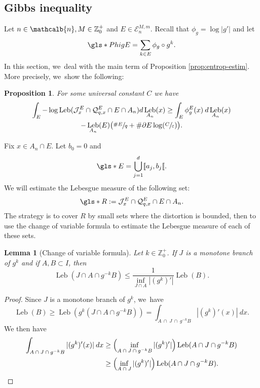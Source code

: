 \documentclass[JEP,XML,SOM,Unicode,NoFloatCountersInSection,published]{cedram}
\DeclareMathOperator{\Leb}{Leb}
\newcommand{\mcbn}{{\mathcalb{n}}}
\newtheorem{lem}[thm]{Lemma}
\newtheorem{prop}[thm]{Proposition}
\theoremstyle{definition}
\newcommand{\bbZ}{{\mathbb{Z}}}
\begin{document}
\subsection{Gibbs inequality}
\label{ssec:gibbs}

Let $n \in \mcbn, M \in \bbZ_0^+$ and $E \in \mathcal{E}_n^{M,m}$. Recall that $\phi_g = \log |g'|$ and let
\[
\gls*{PhigE} = \sum_{k \in E} \phi_g \circ g^k.
\]
In this section, we~deal with the main term of Proposition \ref{prop:entrop-estim}.
More precisely, we~show the following:

\begin{prop}
\label{prop:Gibbs}
For some universal constant $C$ we have
\begin{multline*}
\int_E - \log \Leb(\mathcal{J}^E_x \cap \mathcal{Q}_{q,x}^E \cap E \cap A_n) d \Leb_{A_n}(x)
\geq \int_E \phi_g^E(x) \: d \Leb_{A_n}(x)\\
- \Leb_{A_n}(E) \bigl (\sfrac{\# E }{q} + \# \partial E \log (\sfrac{C}{\varepsilon}) \bigr).
\end{multline*}
\end{prop}

Fix $x \in A_n \cap E$. Let $b_0 = 0$ and
\[
\gls*{E} = \bigcup_{j = 1}^d [\![ a_j, b_j [\![.
\]
We will estimate the Lebesgue measure of the following set:
\[
\gls*{R} := \mathcal{J}^E_x \cap \mathcal{Q}_{q,x}^{E} \cap E \cap A_n.
\]
The strategy is to cover $R$ by small sets where the distortion is bounded, then to use the change of variable formula to estimate the Lebesgue measure of each of these sets.

\begin{lem}[Change of variable formula]
\label{lem:chgt-var}
Let $k \in \bbZ_0^+$. If $J$ is a monotone branch of $g^k$ and if $A,B \subset I$, then
\[
\Leb(J \cap A \cap g^{-k} B) \leq \frac{1}{\inf_{J \cap A} |(g^k)'|} \Leb(B).
\]
\end{lem}
\begin{proof}
Since $J$ is a monotone branch of $g^k$, we~have
\[
\Leb(B) \geq \Leb(g^k(J \cap A \cap g^{-k} B)) = \int_{A \: \cap \: J \: \cap \: g^{-k} B} |(g^k)'(x)| \: dx.
\]
We then have
\begin{align*}
\int_{A \: \cap \: J \: \cap \: g^{-k} B} |(g^k)'(x)| \: dx
&\geq \Bigl (\inf_{A \: \cap \: J \: \cap \: g^{-k} B} |(g^k)'| \Bigr) \Leb(A \cap J \cap g^{-k} B)\\
&\geq \left (\inf_{A \: \cap \: J} |(g^k)'| \right) \Leb(A \cap J \cap g^{-k} B).\qedhere
\end{align*}
\end{proof}
\end{document}
